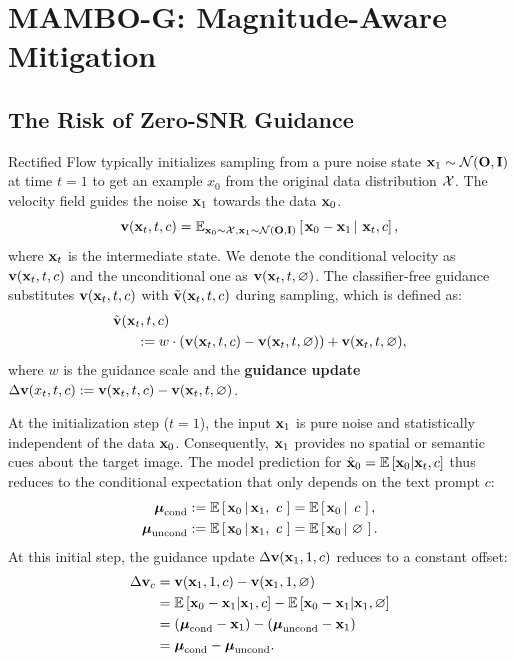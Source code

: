 \section{MAMBO-G: Magnitude-Aware Mitigation}
\subsection{The Risk of Zero-SNR Guidance}
Rectified Flow \cite{liu2022flow} typically initializes sampling from a pure noise state $\textbf{x}_1\sim\mathcal{N}(\textbf{O}, \textbf{I})$ at time $t=1$ to get an example $x_0$ from the original data distribution $\mathcal X$. The velocity field guides the noise $\textbf{x}_1$ towards the data $\textbf{x}_0$.
\begin{equation}
    \textbf{v}(\textbf{x}_t, t, c) = \mathbb{E}_{\textbf{x}_0\sim \mathcal X, \textbf{x}_1\sim\mathcal N(\textbf{O}, \textbf{I})}\left[\left. \textbf{x}_0 - \textbf{x}_1 \,\right|\, \textbf{x}_t, c \right],
\end{equation}
where $\textbf{x}_t$ is the intermediate state. We denote the conditional velocity as $\textbf{v}(\textbf{x}_t, t, c)$ and the unconditional one as $\textbf{v}(\textbf{x}_t, t, \varnothing)$. The classifier-free guidance substitutes $\textbf{v}(\textbf{x}_t, t, c)$ with $\tilde{\textbf{v}}(\textbf{x}_t, t, c)$ during sampling, which is defined as:
\begin{equation}
\begin{aligned}
    \tilde{\textbf{v}}(\textbf{x}_t, t, c) &\\:= w&\cdot(\textbf{v}(\textbf{x}_t, t, c) - \textbf{v}(\textbf{x}_t,t,\varnothing)) + \textbf{v}(\textbf{x}_t,t,\varnothing),
\end{aligned}
\end{equation}
where $w$ is the guidance scale and the \textbf{guidance update} $\Delta\textbf{v}(x_t,t,c):=\textbf{v}(\textbf{x}_t, t, c) - \textbf{v}(\textbf{x}_t,t,\varnothing)$.

At the initialization step ($t=1$), the input $\textbf{x}_1$ is pure noise and statistically independent of the data $\textbf{x}_0$. Consequently, $\textbf{x}_1$ provides no spatial or semantic cues about the target image. The model prediction for $\hat{\textbf{x}}_0=\mathbb{E}\left[\textbf{x}_0|\textbf{x}_t,c\right]$ thus reduces to the conditional expectation that only depends on the text prompt $c$:
\begin{equation}
\begin{aligned}
    \boldsymbol{\mu}_{{\text{cond}}}&:= \mathbb{E}\left[\left.\textbf{x}_0 \,\right|\textbf{x}_1, ~c~ \right]= \mathbb{E}\left[\left.\textbf{x}_0 \,\right|~c~ \right], \\
    \boldsymbol{\mu}_{{\text{uncond}}}&:= \mathbb{E}\left[\left.\textbf{x}_0 \,\right|\textbf{x}_1, ~c~ \right]= \mathbb{E}\left[\left.\textbf{x}_0 \,\right|\, \varnothing~ \right].
\end{aligned}
\end{equation}
At this initial step, the guidance update $\Delta \textbf{v}(\textbf{x}_1,1,c)$ reduces to a constant offset:
\begin{equation}
\begin{aligned}
    \Delta \textbf{v}_c &= \textbf{v}(\textbf{x}_1, 1, c) - \textbf{v}(\textbf{x}_1, 1, \varnothing) \\
    &=\mathbb{E}\left[\textbf{x}_0-\textbf{x}_1|\textbf{x}_1,c\right] - \mathbb{E}\left[\textbf{x}_0-\textbf{x}_1|\textbf{x}_1,\varnothing\right]\\
    &=(\boldsymbol{\mu}_{{\text{cond}}} - \textbf{x}_1) - (\boldsymbol{\mu}_{{\text{uncond}}} - \textbf{x}_1)\\
    &= \boldsymbol{\mu}_{{\text{cond}}} - \boldsymbol{\mu}_{{\text{uncond}}}.
\end{aligned}
\end{equation}

